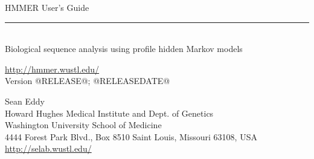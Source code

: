 \begin{titlepage}
{\Large

\vspace*{\fill}

\noindent
{\Huge {HMMER User's Guide}} \\ 
\rule[2pt]{\textwidth}{1pt} \\
\hspace*{\fill} {\large {Biological sequence analysis using
profile hidden Markov models} \\ }

\vspace*{\fill}

\begin{center}
\url{http://hmmer.wustl.edu/}\\
Version @RELEASE@; @RELEASEDATE@ \\ 

\vspace*{\fill}

Sean Eddy\\
Howard Hughes Medical Institute and Dept. of Genetics\\
Washington University School of Medicine\\
4444 Forest Park Blvd., Box 8510
Saint Louis, Missouri 63108, USA\\
\url{http://selab.wustl.edu/} \\
\end{center}

\vspace*{\fill}

}
\end{titlepage}
